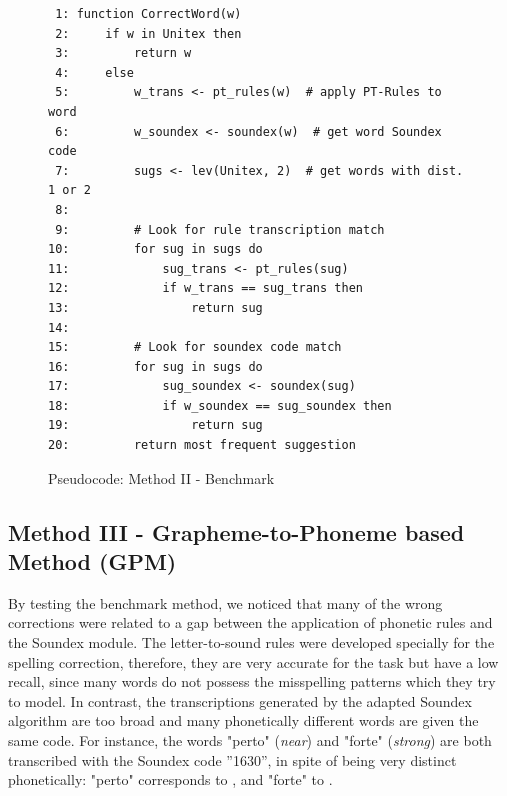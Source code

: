 \begin{figure}
\scriptsize
\caption{Pseudocode: Method II - Benchmark}\label{fig:pseudocode-method2}
\begin{lstlisting}
 1: function CorrectWord(w)
 2:     if w in Unitex then
 3:         return w
 4:     else
 5:         w_trans <- pt_rules(w)  # apply PT-Rules to word
 6:         w_soundex <- soundex(w)  # get word Soundex code
 7:         sugs <- lev(Unitex, 2)  # get words with dist. 1 or 2
 8:         
 9:         # Look for rule transcription match
10:         for sug in sugs do
11:             sug_trans <- pt_rules(sug)
12:             if w_trans == sug_trans then
13:                 return sug
14:   
15:         # Look for soundex code match
16:         for sug in sugs do
17:             sug_soundex <- soundex(sug)
18:             if w_soundex == sug_soundex then
19:                 return sug
20:         return most frequent suggestion
\end{lstlisting}
\end{figure}


\subsection{Method III - Grapheme-to-Phoneme based Method (GPM)}

By testing the benchmark method, we noticed that many of the wrong corrections were related to a gap between the application of phonetic rules and 
the Soundex module. The letter-to-sound rules were developed specially
for the spelling correction, therefore, they are very accurate for the task but have a low recall, since many words do not possess the misspelling patterns 
which they try to model. In contrast, the transcriptions generated by the adapted
Soundex algorithm are too broad and many phonetically different words are given the same code. For instance, the words "perto" (\emph{near}) and "forte" (\emph{strong}) are both
transcribed with the Soundex code ''1630'', in spite of being very distinct phonetically: 
"perto" corresponds to \textipa{['pEh.tU]}, and "forte" to .

